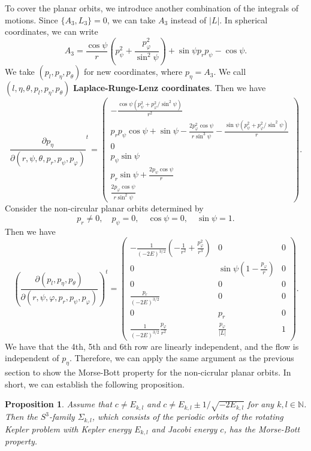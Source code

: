 \documentclass{amsart}
\newcommand{\N}{\mathbb{N}}
\newcommand{\vp}{\varphi}
\newcommand{\pp}{\partial}
\newtheorem{prop}[thm]{Proposition}
\begin{document}
To cover the planar orbits, we introduce another combination of the integrals of motions.
Since $\{A_3,L_3\}=0$, we can take $A_3$ instead of $|L|$.
In spherical coordinates, we can write
	$$
	A_3 = \frac{\cos\psi}{r}\left(p_\psi^2 + \frac{p_\vp^2}{\sin^2\psi}\right) + \sin\psi p_r p_\psi - \cos \psi.
	$$
We take $(p_l,p_\eta,p_\theta)$ for new coordinates, where $p_\eta=A_3$.
We call $(l,\eta,\theta,p_l,p_\eta,p_\theta)$ \textbf{Laplace-Runge-Lenz coordinates}.
Then we have
$$
\frac{\pp p_\eta}{\pp(r,\psi,\theta,p_r,p_\psi,p_\vp)}^t
=\begin{pmatrix}
	-\frac{\cos \psi (p_\psi^2 + p_\vp^2 /\sin^2 \psi)}{r^2}\\
	p_r p_\psi \cos\psi + \sin\psi -\frac{2p_\vp^2 \cos\psi}{r\sin^3 \psi} - \frac{\sin\psi (p_\psi^2 + p_\vp^2/\sin^2\psi)}{r}\\
	0\\
	p_\psi \sin\psi\\
	p_r\sin\psi + \frac{2p_\psi \cos\psi}{r}\\
	\frac{2p_\vp \cos\psi}{r \sin^2\psi}
\end{pmatrix}.
$$
Consider the non-circular planar orbits determined by 
$$
p_r\neq0,\quad p_\psi =0,\quad \cos\psi=0,\quad \sin\psi=1.
$$
Then we have
$$
\left(\frac{\pp (p_l,p_\eta,p_\theta)}{\pp(r,\psi,\vp,p_r,p_\psi,p_\vp)}\right)^t
=
\begin{pmatrix}
	-\frac{1}{(-2E)^{3/2}}\left( - \frac{1}{r^2} + \frac{p_\vp^2}{r^3}\right)
	&
	0
	&
	0
	\\
	0
	&
	\sin\psi\left( 1 - \frac{p_\vp}{r}\right)
	&
	0
	\\0
	&
	0
	&
	0
	\\\frac{p_r}{(-2E)^{3/2}}
	&
	0
	&
	0
	\\
	0&
	p_r &
	0
	\\\frac{1}{(-2E)^{3/2}}\frac{p_\vp}{r^2}
	&
	\frac{p_\vp}{|L|}
	&
	1
\end{pmatrix}.
$$
We have that the 4th, 5th and 6th row are linearly independent, and the flow is independent of $p_\eta$.
Therefore, we can apply the same argument as the previous section to show the Morse-Bott property for the non-cicrular planar orbits.
In short, we can establish the following proposition.
	\begin{prop}\label{Proposition - Morse-Bott property}
		Assume that $c\neq E_{k,l}$ and $c\neq E_{k,l}\pm1/\sqrt{-2E_{k,l}}$ for any $k,l\in\N$.
		Then the $S^3$-family $\Sigma_{k,l}$, which consists of the periodic orbits of the rotating Kepler problem with Kepler energy $E_{k,l}$ and Jacobi energy $c$, has the Morse-Bott property.
	\end{prop}
\end{document}
